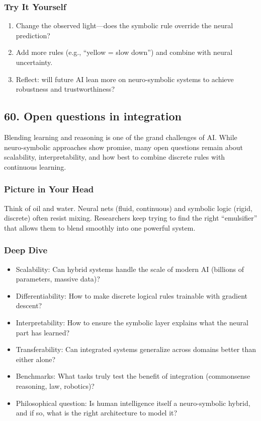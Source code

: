 \documentclass[
  letterpaper,
  DIV=11,
  numbers=noendperiod]{scrreprt}
\providecommand{\tightlist}{%
  \setlength{\itemsep}{0pt}\setlength{\parskip}{0pt}}
\begin{document}
\subsubsection{Try It Yourself}\label{try-it-yourself-58}

\begin{enumerate}
\def\labelenumi{\arabic{enumi}.}
\tightlist
\item
  Change the observed light---does the symbolic rule override the neural
  prediction?
\item
  Add more rules (e.g., ``yellow = slow down'') and combine with neural
  uncertainty.
\item
  Reflect: will future AI lean more on neuro-symbolic systems to achieve
  robustness and trustworthiness?
\end{enumerate}

\subsection{60. Open questions in
integration}\label{open-questions-in-integration}

Blending learning and reasoning is one of the grand challenges of AI.
While neuro-symbolic approaches show promise, many open questions remain
about scalability, interpretability, and how best to combine discrete
rules with continuous learning.

\subsubsection{Picture in Your Head}\label{picture-in-your-head-59}

Think of oil and water. Neural nets (fluid, continuous) and symbolic
logic (rigid, discrete) often resist mixing. Researchers keep trying to
find the right ``emulsifier'' that allows them to blend smoothly into
one powerful system.

\subsubsection{Deep Dive}\label{deep-dive-59}

\begin{itemize}
\tightlist
\item
  Scalability: Can hybrid systems handle the scale of modern AI
  (billions of parameters, massive data)?
\item
  Differentiability: How to make discrete logical rules trainable with
  gradient descent?
\item
  Interpretability: How to ensure the symbolic layer explains what the
  neural part has learned?
\item
  Transferability: Can integrated systems generalize across domains
  better than either alone?
\item
  Benchmarks: What tasks truly test the benefit of integration
  (commonsense reasoning, law, robotics)?
\item
  Philosophical question: Is human intelligence itself a neuro-symbolic
  hybrid, and if so, what is the right architecture to model it?
\end{itemize}
\end{document}
